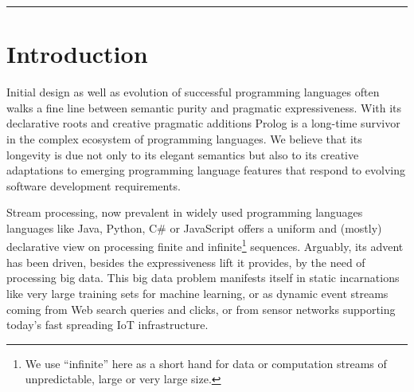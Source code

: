 \documentclass{new_tlp}
\begin{document}
\begin{comment}
\begin{abstract}
Lazy stream generators provide a unified interface to stateful computations, I/O operations as well as algorithms producing finite or infinite sequences. 

As a special instance, we introduce answer stream generators that 
encapsulate the work of coroutining first-class logic engines and support interoperation between forward recursive {\em AND-streams} and backtracking-generated {\em OR-streams}. 

Stream generators are exposed to the application programmer either through an abstract sequence manipulation API or as lazy lists. We define an algebra of stream generator operations that extends Prolog via an embedded language interpreter providing a compact notation for composition mechanisms and supports moving between isomorphic sequence representations.
\end{abstract}
\end{comment}
\hrule


\section{Introduction}

Initial design as well as evolution of successful programming languages often walks a fine line between semantic purity and pragmatic expressiveness. With its declarative roots and creative pragmatic additions Prolog is a long-time survivor in the complex ecosystem of programming languages. We believe that its longevity is due not only to its elegant semantics but also to its creative adaptations to emerging programming language features that respond to evolving software development requirements.

Stream processing, now prevalent in widely used programming languages languages like Java, Python, C\# or JavaScript offers a uniform and (mostly) declarative view on processing finite 
and infinite\footnote{We use ``infinite'' here as a short hand  for data or computation streams of unpredictable, large or very large size.} sequences. Arguably, its advent has been driven, besides the expressiveness lift it provides, by the need of processing big data. This big data problem manifests itself in static incarnations like very large training sets for machine learning, or as dynamic event streams coming from Web search queries and clicks,  or from sensor networks supporting today's fast spreading IoT infrastructure.
 
\end{document}
